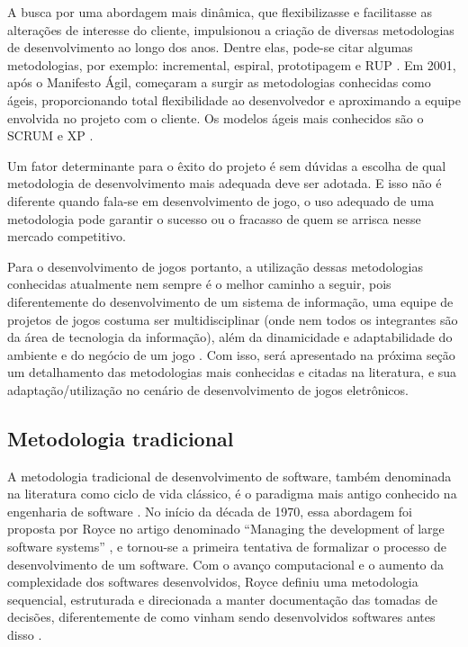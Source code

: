 \documentclass[quali]{ppgccufscar}
\begin{document}
A busca por uma abordagem mais dinâmica, que flexibilizasse e facilitasse as alterações de interesse do cliente, impulsionou a criação de diversas metodologias de desenvolvimento ao longo dos anos. Dentre elas, pode-se citar algumas metodologias, por exemplo: incremental, espiral, prototipagem e RUP \cite{sommerville2010,pressman2005}. Em 2001, após o Manifesto Ágil, começaram a surgir as metodologias conhecidas como ágeis, proporcionando total flexibilidade ao desenvolvedor e aproximando a equipe envolvida no projeto com o cliente. Os modelos ágeis mais conhecidos são o SCRUM \cite{schwaber1997} e XP \cite{beck2000}.

Um fator determinante para o êxito do projeto é sem dúvidas a escolha de qual metodologia de desenvolvimento mais adequada deve ser adotada. E isso não é diferente quando fala-se em desenvolvimento de jogo, o uso adequado de uma metodologia pode garantir o sucesso ou o fracasso de quem se arrisca nesse mercado competitivo.

Para o desenvolvimento de jogos portanto, a utilização dessas metodologias conhecidas atualmente nem sempre é o melhor caminho a seguir, pois diferentemente do desenvolvimento de um sistema de informação, uma equipe de projetos de jogos costuma ser multidisciplinar (onde nem todos os integrantes são da área de tecnologia da informação), além da dinamicidade e adaptabilidade do ambiente e do negócio de um jogo \cite{barros2007}. Com isso, será apresentado na próxima seção um detalhamento das metodologias mais conhecidas e citadas na literatura, e sua adaptação/utilização no cenário de desenvolvimento de jogos eletrônicos.


\subsection{Metodologia tradicional}
\label{sec_cascata}

A metodologia tradicional de desenvolvimento de software, também denominada na literatura como ciclo de vida clássico, é o paradigma mais antigo conhecido na engenharia de software \cite{pressman2005}. No início da década de 1970, essa abordagem foi proposta por Royce no artigo denominado “Managing the development of large software systems” \cite{royce1970}, e tornou-se a primeira tentativa de formalizar o processo de desenvolvimento de um software. 
Com o avanço computacional e o aumento da complexidade dos softwares desenvolvidos, Royce definiu uma metodologia sequencial, estruturada e direcionada a manter documentação das tomadas de decisões, diferentemente de como vinham sendo desenvolvidos softwares antes disso \cite{franco2007}.
\end{document}
